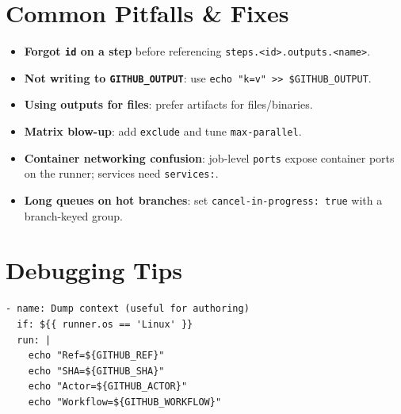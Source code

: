 \documentclass[11pt]{article}
\begin{document}
\section{Common Pitfalls \& Fixes}
\begin{itemize}
  \item \textbf{Forgot \texttt{id} on a step} before referencing \texttt{steps.<id>.outputs.<name>}.
  \item \textbf{Not writing to \texttt{GITHUB\_OUTPUT}}: use \texttt{echo "k=v" >> \$GITHUB\_OUTPUT}.
  \item \textbf{Using outputs for files}: prefer artifacts for files/binaries.
  \item \textbf{Matrix blow-up}: add \texttt{exclude} and tune \texttt{max-parallel}.
  \item \textbf{Container networking confusion}: job-level \texttt{ports} expose container ports on the runner; services need \texttt{services:}.
  \item \textbf{Long queues on hot branches}: set \texttt{cancel-in-progress: true} with a branch-keyed group.
\end{itemize}

\section{Debugging Tips}
\begin{verbatim}
- name: Dump context (useful for authoring)
  if: ${{ runner.os == 'Linux' }}
  run: |
    echo "Ref=${GITHUB_REF}"
    echo "SHA=${GITHUB_SHA}"
    echo "Actor=${GITHUB_ACTOR}"
    echo "Workflow=${GITHUB_WORKFLOW}"
\end{verbatim}
\end{document}
